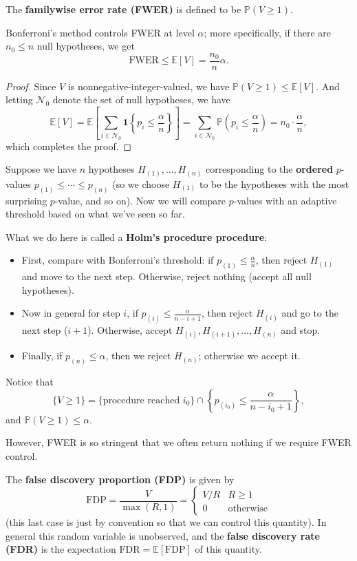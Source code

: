 \begin{defn}
The \textbf{familywise error rate (FWER)} is defined to be $\mathbb{P}(V \geq 1)$.
\end{defn}

\begin{thm}
Bonferroni's method controls FWER at level $\alpha$; more specifically, if there are $n_0 \leq n$ null hypotheses, we get
\[
\mathrm{FWER} \leq \mathbb{E}[V] = \frac{n_0}{n}\alpha.
\]
\end{thm}

\begin{proof}
Since $V$ is nonnegative-integer-valued, we have $\mathbb{P}(V \geq 1) \leq \mathbb{E}[V]$. And letting $\mathcal{N}_0$ denote the set of null hypotheses, we have
\[
\mathbb{E}[V] = \mathbb{E}\left[\sum_{i \in \mathcal{N}_0} \mathbf{1}\left\{p_i \leq \frac{\alpha}{n}\right\}\right] = \sum_{i \in \mathcal{N}_0} \mathbb{P}\left(p_i \leq \frac{\alpha}{n}\right) = n_0 \cdot \frac{\alpha}{n},
\]
which completes the proof.
\end{proof}

Suppose we have $n$ hypotheses $H_{(1)}, \ldots, H_{(n)}$ corresponding to the \textbf{ordered} $p$-values $p_{(1)} \leq \cdots \leq p_{(n)}$ (so we choose $H_{(1)}$ to be the hypotheses with the most surprising $p$-value, and so on). Now we will compare $p$-values with an adaptive threshold based on what we've seen so far.

What we do here is called a \textbf{Holm's procedure procedure}:
\begin{itemize}
    \item First, compare with Bonferroni's threshold: if $p_{(1)} \leq \frac{\alpha}{n}$, then reject $H_{(1)}$ and move to the next step. Otherwise, reject nothing (accept all null hypotheses).
    \item Now in general for step $i$, if $p_{(i)} \leq \frac{\alpha}{n - i + 1}$, then reject $H_{(i)}$ and go to the next step ($i + 1$). Otherwise, accept \underline{$H_{(i)}, H_{(i+1)}, \ldots, H_{(n)}$} and stop.
    \item Finally, if $p_{(n)} \leq \alpha$, then we reject $H_{(n)}$; otherwise we accept it.
\end{itemize}
Notice that
\[
\{V \geq 1\} = \{\text{procedure reached } i_0\} \cap \left\{p_{(i_0)} \leq \frac{\alpha}{n - i_0 + 1}\right\},
\]
and $\mathbb{P}(V \geq 1) \leq \alpha$.

However, FWER is so stringent that we often return nothing if we require FWER control.
\begin{defn}
The \textbf{false discovery proportion (FDP)} is given by
\[
\mathrm{FDP} = \frac{V}{\max(R, 1)} = 
\begin{cases}
V/R & R \geq 1 \\
0 & \text{otherwise}
\end{cases}
\]
(this last case is just by convention so that we can control this quantity). In general this random variable is unobserved, and the \textbf{false discovery rate (FDR)} is the expectation $\mathrm{FDR} = \mathbb{E}[\mathrm{FDP}]$ of this quantity.
\end{defn}


